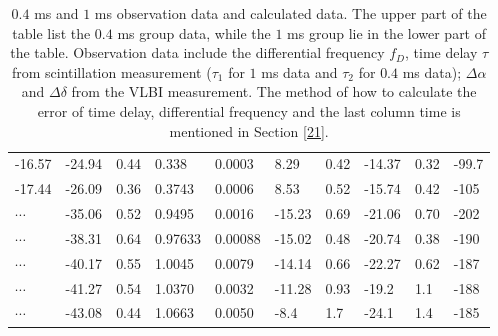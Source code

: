 \documentclass[useAMS,usenatbib]{mn2e}
\begin{document}
\begin{table}
\begin{tabular}{llllllllll}
-16.57  &-24.94                            & 0.44      & 0.338 & 0.0003         & 8.29    & 0.42                                     & -14.37    & 0.32      &-99.7                                \\

-17.44   &-26.09                            & 0.36      & 0.3743 & 0.0006         & 8.53    & 0.52                                     & -15.74    & 0.42      &-105                               
\\ \hline
$\cdots$&         -35.06                           & 0.52                               & 0.9495               & 0.0016                              & -15.23  & 0.69                                     & -21.06   & 0.70   &-202                                   \\

$\cdots$ & -38.31                           & 0.64                               & 0.97633              & 0.00088                             & -15.02  & 0.48                                    & -20.74   & 0.38  &-190                                    \\
$\cdots$ & -40.17                           & 0.55                               & 1.0045              & 0.0079                             & -14.14  & 0.66                                    & -22.27   & 0.62  &-187                                   \\

$\cdots$ & -41.27                           & 0.54                               & 1.0370              & 0.0032                              & -11.28  & 0.93                                     & -19.2   & 1.1   &-188                                   \\

$ \cdots$ & -43.08                           & 0.44                               & 1.0663              & 0.0050                              & -8.4   & 1.7                                      & -24.1   & 1.4   &-185   \\
 \hline                                 
\end{tabular}
\caption{ $0.4$ ms and $1$ ms observation data and calculated data. 
The upper part of the table list the $0.4$ ms group data, while the $1$ ms group lie in the lower part of the table. 
Observation data include the differential frequency $f_D$, time delay $\tau$ from scintillation measurement ($\tau_1$ for $1$ ms data and $\tau_2$ for $0.4$ ms data); $\Delta\alpha$ and $\Delta\delta$ from the VLBI measurement. The method of how to calculate the error of time delay, differential frequency and the last column time is mentioned in Section \ref{21}.}
\label{table:apex}
\end{table}
\end{document}
